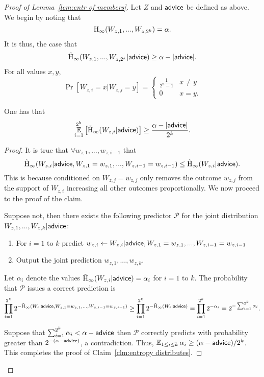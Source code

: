 \begin{proof}[Proof of Lemma~\ref{lem:entr of members}]
Let $Z$ and ${\mathsf{advice}}$ be defined as above. We begin by noting that 
\[
\mathrm{H}_\infty(W_{z, 1},..., W_{z, 2^k})=\alpha.
\]
 It is thus, the case that 
\[
\tilde{\mathrm{H}}_\infty(W_{z, 1},..., W_{z, 2^ k} | {\mathsf{advice}}) \ge \alpha - |{\mathsf{advice}}|.
\]
For all values $x, y$, 
\[
\Pr[W_{z, i} =x | W_{z, j} = y] = \begin{cases} \frac{1}{2^n-1} &x\neq y\\0&x=y.\end{cases}
\]
\begin{claim}
One has that 
\begin{align*}
\operatorname*{\mathbb{E}}_{i=1}^{2^k} \left[\tilde{\mathrm{H}}_\infty(W_{z, i} | {\mathsf{advice}})\right] \ge \frac{\alpha - |{\mathsf{advice}}|}{2^k}.
\end{align*}
\label{clm:entropy distributes}
\end{claim}
\begin{proof}
It is true that $\forall w_{z,1},..., w_{z,i-1}$ that 
\[
\tilde{\mathrm{H}}_\infty(W_{z,i} | {\mathsf{advice}}, W_{z, 1}=w_{z,1},..., W_{z,i-1}=w_{z,i-1}) \le \tilde{\mathrm{H}}_\infty(W_{z,i} | {\mathsf{advice}}).
\]
This is because conditioned on $W_{z, j} =w_{z,j}$ only removes the outcome $w_{z,j}$ from the support of $W_{z,i}$ increasing all other outcomes proportionally.  
We now proceed to the proof of the claim. 

Suppose not, then there exists the following predictor $\mathcal{P}$ for the joint distribution $W_{z, 1},..., W_{z, k} | {\mathsf{advice}}$:
\begin{enumerate}
\item For $i=1$ to $k$ predict $w_{z,i}\leftarrow W_{z, i}| {\mathsf{advice}}, W_{z,1}=w_{z,1},..., W_{z,i-1}=w_{z,i-1}$
\item Output the joint prediction $w_{z,1},..., w_{z, k}$.  
\end{enumerate}
Let $\alpha_i$ denote the values $\tilde{\mathrm{H}}_\infty(W_{z,i}| {\mathsf{advice}}) = \alpha_i$ for $i=1$ to $k$. 
The probability that $\mathcal{P}$ issues a correct prediction is
\begin{align*}
\prod_{i=1}^{2^k} 2^{-\tilde{\mathrm{H}}_\infty(W_i | {\mathsf{advice}},  W_{z,1}=w_{z,1},..., W_{z,i-1}=w_{z,i-1})} \ge \prod_{i=1}^{2^k} 2^{-\tilde{\mathrm{H}}_\infty(W_i | {\mathsf{advice}})} = \prod_{i=1}^{2^k} 2^{-\alpha_i}  = 2^{-\sum_{i=1}^{2^k} \alpha_i}.
\end{align*}

\noindent
Suppose that $\sum_{i=1}^{2^k} \alpha_i < \alpha-{\mathsf{advice}}$ then $\mathcal{P}$ correctly predicts with probability greater than $2^{-(\alpha-{\mathsf{advice}})}$, a contradiction.  Thus, $\operatorname*{\mathbb{E}}_{1\le i\le k} \alpha_i \ge (\alpha-{\mathsf{advice}})/2^k$. 
This completes the proof of Claim~\ref{clm:entropy distributes}.
\end{proof}


\end{proof}
